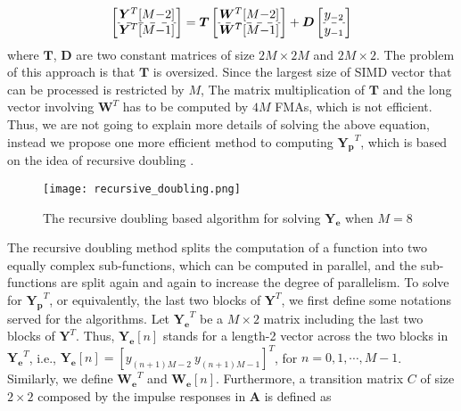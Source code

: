 \begin{equation*}
    \begin{aligned}
        \left[\arraycolsep=1.0pt\def\arraystretch{1.0}
                \begin{array}{c}
                \bm{Y}^T[M{-}2] \\  \hdashline
                \bm{Y}^T[M{-}1] \\ 
                \end{array}\right] = \bm{T} \left[\arraycolsep=1.0pt\def\arraystretch{1.0}
                \begin{array}{c}
                \bm{W}^T[M{-}2] \\  \hdashline
                \bm{W}^T[M{-}1] \\ 
                \end{array}\right] + \bm{D} \left[\arraycolsep=1.0pt\def\arraystretch{1.0}
                \begin{array}{c}
                y_{-2} \\  \hdashline
                y_{-1} \\ 
                \end{array}\right] \\
    \end{aligned}
\end{equation*}
where $\bm{T}$, $\bm{D}$ are two constant matrices of size $2M \times 2M$ and $2M \times 2$.
The problem of this approach is that $\bm{T}$ is oversized.
Since the largest size of SIMD vector that can be processed is restricted by $M$,
The matrix multiplication of $\bm{T}$ and the long vector involving $\bm{W}^T$ has to be computed by
$4M$ FMAs, which is not efficient. Thus, we are not going to explain more details of solving the above equation,
instead we propose one more efficient method to computing 
$\bm{Y_p}^T$, which is based on the idea of recursive doubling \cite{Kogge_73}.

\begin{figure}[t]
    \centerline{\texttt{[image: recursive\_doubling.png]}}
    \caption{The recursive doubling based algorithm for solving $\bm{Y_e}$ when $M{=}8$}
    \label{fig:Recursive_doubling_for_Ye}
  \end{figure}


The recursive doubling method splits the computation of a function into two equally complex sub-functions, which can be computed in parallel,
and the sub-functions are split again and again to increase the degree of parallelism. 
To solve for $\bm{Y_p}^T$, or equivalently, the last two blocks of $\bm{Y}^T$,
we first define some notations served for the algorithms. Let $\bm{Y_e}^T$ be a $M \times 2$ matrix including
the last two blocks of $\bm{Y}^T$. Thus, $\bm{Y_e}[n]$ stands for a length-2 vector across the two blocks in $\bm{Y_e}^T$, i.e.,
$\bm{Y_e}[n] = \left[y_{(n+1)M-2} ~ y_{(n+1)M-1}\right]^T$, for $n=0,1,\cdots,M{-}1$.
Similarly, we define $\bm{W_e}^T$ and $\bm{W_e}[n]$.
Furthermore, a transition matrix $C$ of size $2 \times 2$ composed by the impulse responses in $\bm{A}$ is defined as

